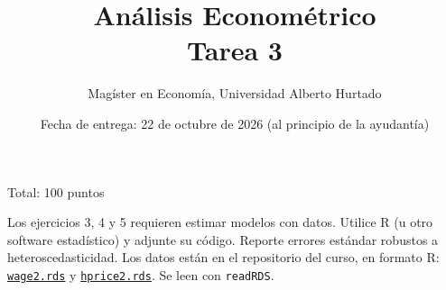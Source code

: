 \documentclass[letterpaper,11pt]{article}
\theoremstyle{plain}
\theoremstyle{definition}
\theoremstyle{remark}
\begin{document}
	\title {An\'alisis Econom\'etrico  \\ Tarea 3}
	\author{Mag\'ister en Econom\'ia, Universidad Alberto Hurtado}
	\date{Fecha de entrega: 22 de octubre de 2026 (al principio de la ayudant\'ia)}

\maketitle

Total: 100 puntos

Los ejercicios 3, 4 y 5 requieren estimar modelos con datos. Utilice R (u otro software
estad\'istico) y adjunte su c\'odigo. Reporte errores est\'andar robustos a
heteroscedasticidad. Los datos est\'an en el repositorio del curso, en formato R:
\href{https://github.com/ramirode/econometria_mae/raw/main/problem-sets/datos/wage2.rds}{\texttt{wage2.rds}} y
\href{https://github.com/ramirode/econometria_mae/raw/main/problem-sets/datos/hprice2.rds}{\texttt{hprice2.rds}}. Se leen con \texttt{readRDS}.
\end{document}
